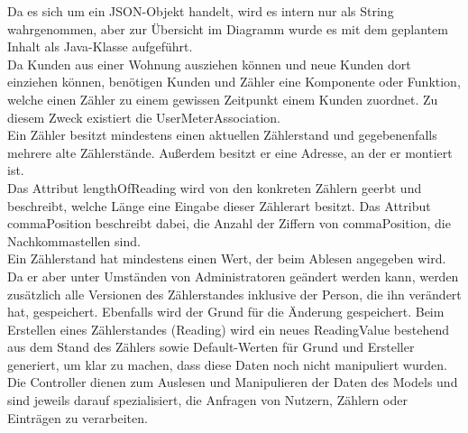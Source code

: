 Da es sich um ein JSON-Objekt handelt, wird es intern nur als String wahrgenommen, aber zur Übersicht im Diagramm wurde es mit dem geplantem Inhalt als Java-Klasse aufgeführt.\\
Da Kunden aus einer Wohnung ausziehen können und neue Kunden dort einziehen können, benötigen Kunden und Zähler eine Komponente oder Funktion, welche einen Zähler zu einem gewissen Zeitpunkt einem Kunden zuordnet. 
Zu diesem Zweck existiert die UserMeterAssociation.\\
Ein Zähler besitzt mindestens einen aktuellen Zählerstand und gegebenenfalls mehrere alte Zählerstände. Außerdem besitzt er eine Adresse, an der er montiert ist.\\
Das Attribut lengthOfReading wird von den konkreten Zählern geerbt und beschreibt, welche Länge eine Eingabe dieser Zählerart besitzt. Das Attribut commaPosition beschreibt dabei, die Anzahl der Ziffern von commaPosition, die Nachkommastellen sind.\\
Ein Zählerstand hat mindestens einen Wert, der beim Ablesen angegeben wird. 
Da er aber unter Umständen von Administratoren geändert werden kann, werden zusätzlich alle Versionen des Zählerstandes inklusive der Person, die ihn verändert hat, gespeichert. Ebenfalls wird der Grund für die Änderung gespeichert.
Beim Erstellen eines Zählerstandes (Reading) wird ein neues ReadingValue bestehend aus dem Stand des Zählers sowie Default-Werten für Grund und Ersteller generiert, um klar zu machen, dass diese Daten noch nicht manipuliert wurden.\\
Die Controller dienen zum Auslesen und Manipulieren der Daten des Models und sind jeweils darauf spezialisiert, die Anfragen von Nutzern, Zählern oder Einträgen zu verarbeiten.

